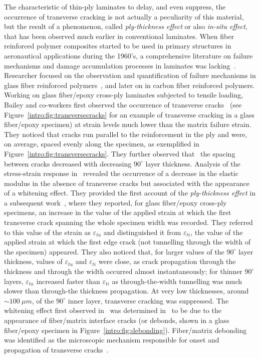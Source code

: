 The characteristic of thin-ply laminates to delay, and even suppress, the occurrence of transverse cracking is not actually a peculiarity of this material, but the result of a phenomenon, called \emph{ply-thickness effect} or also \emph{in-situ effect}, that has been observed much earlier in conventional laminates. When fiber reinforced polymer composites started to be used in primary structures in aeronautical applications during the 1960's, a comprehensive literature on failure mechanisms and damage accumulation processes in laminates was lacking~\cite{Hofer1967}. Researcher focused on the observation and quantification of failure mechanisms in glass fiber reinforced polymers~\cite{Hofer1967,Howe1972,Owen1972}, and later on in carbon fiber reinforced polymers. Working on glass fiber/epoxy cross-ply laminates subjected to tensile loading, Bailey and co-workers first observed the occurrence of transverse cracks~\cite{Garrett1977} (see Figure~\ref{intro:fig:transversecracks} for an example of transverse cracking in a glass fiber/epoxy specimen) at strain levels much lower than the matrix failure strain. They noticed that cracks run parallel to the reinforcement in the ply and were, on average, spaced evenly along the specimen, as exemplified in Figure~\ref{intro:fig:transversecracks}. They further observed that~\cite{Garrett1977,Parvizi1978a} the spacing between cracks decreased with decreasing $90^{\circ}$ layer thickness. Analysis of the stress-strain response in~\cite{Parvizi1978a} revealed the occurrence of a decrease in the elastic modulus in the absence of transverse cracks but associated with the appearance of a whitening effect. They provided the first account of the \emph{ply-thickness effect} in a subsequent work~\cite{Parvizi1978b}, where they reported, for glass fiber/epoxy cross-ply specimens, an increase in the value of the applied strain at which the first transverse crack spanning the whole specimen width was recorded. They referred to this value of the strain as $\varepsilon_{tu}$ and distinguished it from $\varepsilon_{ti}$, the value of the applied strain at which the first edge crack (not tunnelling through the width of the specimen) appeared. They also noticed that, for larger values of the $90^{\circ}$ layer thickness, values of $\varepsilon_{tu}$ and $\varepsilon_{ti}$ were close, as crack propagation through the thickness and through the width occurred almost instantaneously; for thinner $90^{\circ}$ layers, $\varepsilon_{tu}$ increased faster than $\varepsilon_{ti}$ as through-the-width tunnelling was much slower than through-the thickness propagation. At very low thicknesses, around $\sim100\ \mu m$, of the $90^{\circ}$ inner layer, transverse cracking was suppressed. The whitening effect first observed in~\cite{Parvizi1978a} was determined in~\cite{Bailey1979,Bailey1981} to be due to the appearance of fiber/matrix interface cracks (or debonds, shown in a glass fiber/epoxy specimen in Figure~\ref{intro:fig:debonding}). Fiber/matrix debonding was identified as the microscopic mechanism responsible for onset and propagation of transverse cracks~\cite{Bailey1979}.

